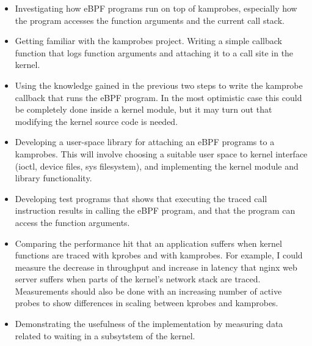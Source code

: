     \begin{itemize}
        \item Investigating how eBPF programs run on top of kamprobes, especially how the program
        accesses the function arguments and the current call stack.
       
        \item Getting familiar with the kamprobes project. Writing a simple callback function that logs 
        function arguments and attaching it to a call site in the kernel.

        \item Using the knowledge gained in the previous two steps to write the kamprobe callback that runs
        the eBPF program. In the most optimistic case this could be completely done inside a kernel module,
        but it may turn out that modifying the kernel source code is needed.

        \item Developing a user-space library for attaching an eBPF programs to a kamprobes. This will involve 
        choosing a suitable user space to kernel interface (ioctl, device files, sys filesystem),
        and implementing the kernel module and library functionality.

        \item Developing test programs that shows that executing the traced call instruction results in calling the 
        eBPF program, and that the program can access the function arguments.



        \item Comparing the performance hit that an application suffers when kernel functions are traced with kprobes
        and with kamprobes. 
        For example, I could measure the decrease in throughput and increase in latency that nginx web server suffers
        when parts of the kernel's network stack are traced.
        Measurements should also be done with an increasing number of active probes to show differences in scaling
        between kprobes and kamprobes.

        \item Demonstrating the usefulness of the implementation by measuring data related to waiting in a subsytstem
        of the kernel.
    \end{itemize}


